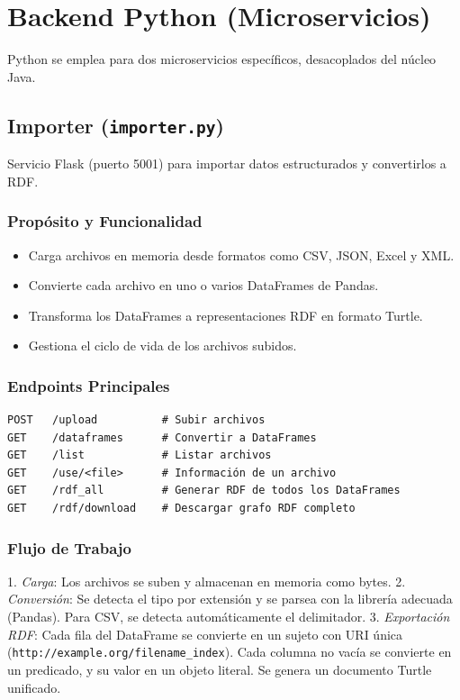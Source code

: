 \documentclass{article}
\begin{document}
\section{Backend Python (Microservicios)}
Python se emplea para dos microservicios específicos, desacoplados del núcleo Java.

\subsection{Importer (\texttt{importer.py})}
Servicio Flask (puerto 5001) para importar datos estructurados y convertirlos a RDF.

\subsubsection{Propósito y Funcionalidad}
\begin{itemize}
    \item Carga archivos en memoria desde formatos como CSV, JSON, Excel y XML.
    \item Convierte cada archivo en uno o varios DataFrames de Pandas.
    \item Transforma los DataFrames a representaciones RDF en formato Turtle.
    \item Gestiona el ciclo de vida de los archivos subidos.
\end{itemize}

\subsubsection{Endpoints Principales}
\begin{verbatim}
POST   /upload          # Subir archivos
GET    /dataframes      # Convertir a DataFrames
GET    /list            # Listar archivos
GET    /use/<file>      # Información de un archivo
GET    /rdf_all         # Generar RDF de todos los DataFrames
GET    /rdf/download    # Descargar grafo RDF completo
\end{verbatim}

\subsubsection{Flujo de Trabajo}
1. \textit{Carga}: Los archivos se suben y almacenan en memoria como bytes.
2. \textit{Conversión}: Se detecta el tipo por extensión y se parsea con la librería adecuada (Pandas). Para CSV, se detecta automáticamente el delimitador.
3. \textit{Exportación RDF}: Cada fila del DataFrame se convierte en un sujeto con URI única (\texttt{http://example.org/filename\_index}). Cada columna no vacía se convierte en un predicado, y su valor en un objeto literal. Se genera un documento Turtle unificado.
\end{document}

